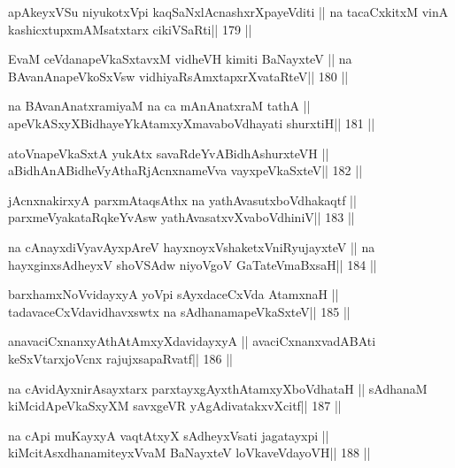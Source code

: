 \begin{shl}
apAkeyxVSu niyukotxV\s pi kaqSaNxlAcnashxrXpayeVditi ||
na tacaCxkitxM vinA kashicxtupxmAMsatxtarx cikiVSaRti\hfill || 179 ||
\end{shl}

\begin{shl}
EvaM ceVdanapeVkaSxtavxM vidheVH kimiti BaNayxteV ||
na BAvanAnapeVkoSxV\s sw vidhiyaRsAmxtapxrXvataRteV\hfill || 180 ||
\end{shl}

\begin{shl}
na BAvanAnatxramiyaM na ca mAnAnatxraM tathA ||
apeVkASxyXBidhayeYkAtamxyXmavaboVdhayati shurxtiH\hfill || 181 ||
\end{shl}

\begin{shl}
atoV\s napeVkaSxtA yukAtx savaRdeYvABidhAshurxteVH ||
aBidhAnABidheVyAthaRjAcnxnameVva vayxpeVkaSxteV\hfill || 182 ||
\end{shl}

\begin{shl}
jAcnxnakirxyA parxmAtaqsAthx na yathAvasutxboVdhakaqtf ||
parxmeVyakataRqkeYvAsw yathAvasatxvXvaboVdhiniV\hfill || 183 ||
\end{shl}

\begin{shl}
na cAnayxdiVyavAyxpAreV hayxnoyxV\s shaketxVniRyujayxteV ||
na hayxginxsAdheyxV shoVSAdw niyoVgoV GaTateV\s maBxsaH\hfill || 184 ||
\end{shl}

\begin{shl}
barxhamxNoV\s vidayxyA yoV\s pi sAyxdaceCxVda AtamxnaH ||
tadavaceCxVdavidhavxswtx na sAdhanamapeVkaSxteV\hfill || 185 ||
\end{shl}

\begin{shl}
anavaciCxnanxyAthAtAmxyXdavidayxyA ||
avaciCxnanxvadABAti keSxVtarxjoVcnx rajujxsapaRvatf\hfill || 186 ||
\end{shl}

\begin{shl}
na cAvidAyxnirAsayxtarx parxtayxgAyxthAtamxyXboVdhataH ||
sAdhanaM kiMcidApeVkaSxyXM savxgeVR yAgAdivatakxvXcitf\hfill || 187 ||
\end{shl}

\begin{shl}
na cApi muKayxyA vaqtAtxyX sAdheyxV\s sati jagatayxpi ||
kiMcitAsxdhanamiteyxVvaM BaNayxteV loVkaveVdayoVH\hfill || 188 ||
\end{shl}

